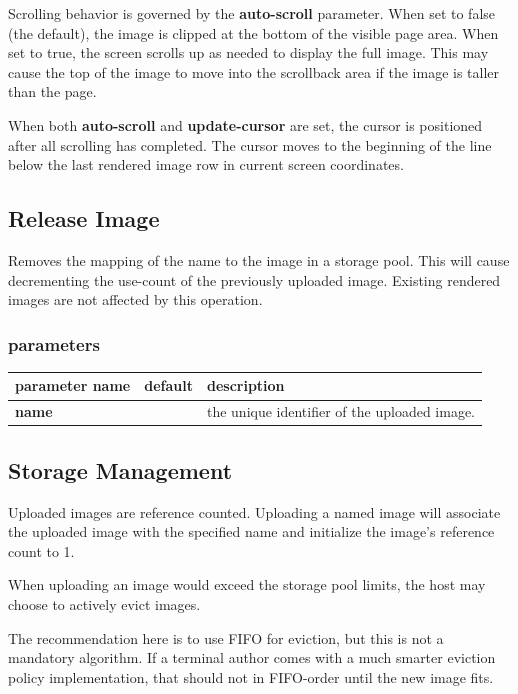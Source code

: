 \documentclass[a4paper]{article}
\begin{document}
Scrolling behavior is governed by the \textbf{auto-scroll} parameter.
When set to false (the default), the image is clipped at the bottom of the visible page area.
When set to true, the screen scrolls up as needed to display the full image.
This may cause the top of the image to move into the scrollback area
if the image is taller than the page.

When both \textbf{auto-scroll} and \textbf{update-cursor} are set,
the cursor is positioned after all scrolling has completed.
The cursor moves to the beginning of the line below the last rendered
image row in current screen coordinates.

\subsection{Release Image} %

Removes the mapping of the name to the image in a storage pool.
This will cause decrementing the use-count of the previously uploaded image.
Existing rendered images are not affected by this operation.

\subsubsection*{parameters}

\begin{tabular}{|l|l|l|}
    \hline
    \textbf{parameter name} & \textbf{default} & \textbf{description} \\
    \hline
    \textbf{name}           &                  & the unique identifier of the uploaded image. \\
    \hline
\end{tabular}

\subsection{Storage Management} %

Uploaded images are reference counted.
Uploading a named image will associate the uploaded image with the specified
name and initialize the image's reference count to 1.

When uploading an image would exceed the storage pool limits,
the host may choose to actively evict images.

The recommendation here is to use FIFO for eviction,
but this is not a mandatory algorithm.
If a terminal author comes with a much smarter eviction policy implementation,
that should not in FIFO-order until the new image fits.
\end{document}
